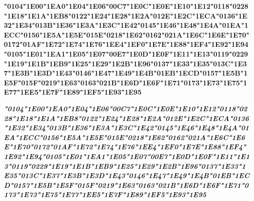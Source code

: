 {\LibertinusSerifPatch\bfseries 
	\char"0104\gs \char"1E00\gs \char"1EA0\gs \char"1E04\gs \char"1E06\gs \char"00C7\gs \char"1E0C\gs \char"1E0E\gs \char"1E10\gs \char"1E12\gs \char"0118\gs \char"0228\gs \char"1E18\gs \char"1E1A\gs \char"1EB8\gs \char"0122\gs \char"1E24\gs \char"1E28\gs \char"1E2A\gs \char"012E\gs \char"1E2C\gs \char"1ECA\gs \char"0136\gs \char"1E32\gs \char"1E34\gs \char"013B\gs \char"1E36\gs \char"1E3A\gs \char"1E3C\gs \char"1E42\gs \char"0145\gs \char"1E46\gs \char"1E48\gs \char"1E4A\gs \char"01EA\gs \char"1ECC\gs \char"0156\gs \char"1E5A\gs \char"1E5E\gs \char"015E\gs \char"0218\gs \char"1E62\gs \char"0162\gs \char"021A\gs \char"1E6C\gs \char"1E6E\gs \char"1E70\gs \char"0172\gs \char"01AF\gs \char"1E72\gs \char"1E74\gs \char"1E76\gs \char"1EE4\gs \char"1EF0\gs \char"1E7E\gs \char"1E88\gs \char"1EF4\gs \char"1E92\gs \char"1E94\gs \char"0105\gs \char"1E01\gs \char"1EA1\gs \char"1E05\gs \char"1E07\gs \char"00E7\gs \char"1E0D\gs \char"1E0F\gs \char"1E11\gs \char"1E13\gs \char"0119\gs \char"0229\gs \char"1E19\gs \char"1E1B\gs \char"1EB9\gs \char"1E25\gs \char"1E29\gs \char"1E2B\gs \char"1E96\gs \char"0137\gs \char"1E33\gs \char"1E35\gs \char"013C\gs \char"1E37\gs \char"1E3B\gs \char"1E3D\gs \char"1E43\gs \char"0146\gs \char"1E47\gs \char"1E49\gs \char"1E4B\gs \char"01EB\gs \char"1ECD\gs \char"0157\gs \char"1E5B\gs \char"1E5F\gs \char"015F\gs \char"0219\gs \char"1E63\gs \char"0163\gs \char"021B\gs \char"1E6D\gs \char"1E6F\gs \char"1E71\gs \char"0173\gs \char"1E73\gs \char"1E75\gs \char"1E77\gs \char"1EE5\gs \char"1E7F\gs \char"1E89\gs \char"1EF5\gs \char"1E93\gs \char"1E95\gs
}

{\LibertinusSerifPatch\itshape\bfseries 
	\char"0104\gs \char"1E00\gs \char"1EA0\gs \char"1E04\gs \char"1E06\gs \char"00C7\gs \char"1E0C\gs \char"1E0E\gs \char"1E10\gs \char"1E12\gs \char"0118\gs \char"0228\gs \char"1E18\gs \char"1E1A\gs \char"1EB8\gs \char"0122\gs \char"1E24\gs \char"1E28\gs \char"1E2A\gs \char"012E\gs \char"1E2C\gs \char"1ECA\gs \char"0136\gs \char"1E32\gs \char"1E34\gs \char"013B\gs \char"1E36\gs \char"1E3A\gs \char"1E3C\gs \char"1E42\gs \char"0145\gs \char"1E46\gs \char"1E48\gs \char"1E4A\gs \char"01EA\gs \char"1ECC\gs \char"0156\gs \char"1E5A\gs \char"1E5E\gs \char"015E\gs \char"0218\gs \char"1E62\gs \char"0162\gs \char"021A\gs \char"1E6C\gs \char"1E6E\gs \char"1E70\gs \char"0172\gs \char"01AF\gs \char"1E72\gs \char"1E74\gs \char"1E76\gs \char"1EE4\gs \char"1EF0\gs \char"1E7E\gs \char"1E88\gs \char"1EF4\gs \char"1E92\gs \char"1E94\gs \char"0105\gs \char"1E01\gs \char"1EA1\gs \char"1E05\gs \char"1E07\gs \char"00E7\gs \char"1E0D\gs \char"1E0F\gs \char"1E11\gs \char"1E13\gs \char"0119\gs \char"0229\gs \char"1E19\gs \char"1E1B\gs \char"1EB9\gs \char"1E25\gs \char"1E29\gs \char"1E2B\gs \char"1E96\gs \char"0137\gs \char"1E33\gs \char"1E35\gs \char"013C\gs \char"1E37\gs \char"1E3B\gs \char"1E3D\gs \char"1E43\gs \char"0146\gs \char"1E47\gs \char"1E49\gs \char"1E4B\gs \char"01EB\gs \char"1ECD\gs \char"0157\gs \char"1E5B\gs \char"1E5F\gs \char"015F\gs \char"0219\gs \char"1E63\gs \char"0163\gs \char"021B\gs \char"1E6D\gs \char"1E6F\gs \char"1E71\gs \char"0173\gs \char"1E73\gs \char"1E75\gs \char"1E77\gs \char"1EE5\gs \char"1E7F\gs \char"1E89\gs \char"1EF5\gs \char"1E93\gs \char"1E95\gs
}
